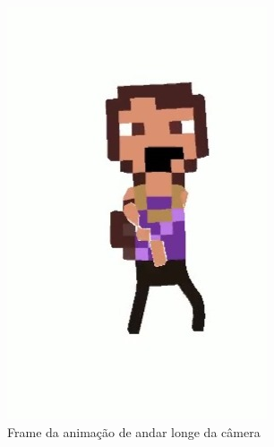 \begin{figure}[htbp]
\begin{subfigure}{0.2\linewidth}
        \includegraphics[width=1\linewidth]{figs/sketchLab/irma2_frame1.jpg}
        \caption{\small Frame da animação de andar longe da câmera}
        \label{fig:sketchIrma2Frame2}
    \end{subfigure}
    \begin{subfigure}{0.2\linewidth}

\end{subfigure}
\end{figure}
